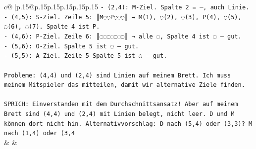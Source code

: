 \documentclass{article}
\begin{document}
{\begin{supertabular}{c@{$\;$}|p{.15\linewidth}@{}p{.15\linewidth}p{.15\linewidth}p{.15\linewidth}p{.15\linewidth}p{.15\linewidth}}
{{{\texttt{{-} (2,4): M{-}Ziel. Spalte 2 = ─, auch Linie.} \\
\texttt{{-} (4,5): S{-}Ziel. Zeile 5: ║M◌◌P◌◌◌║ → M(1), ◌(2), ◌(3), P(4), ◌(5), ◌(6), ◌(7). Spalte 4 ist P.} \\
\texttt{{-} (4,6): P{-}Ziel. Zeile 6: ║◌◌◌◌◌◌◌║ → alle ◌, Spalte 4 ist ◌ – gut.} \\
\texttt{{-} (5,6): O{-}Ziel. Spalte 5 ist ◌ – gut.} \\
\texttt{{-} (5,5): A{-}Ziel. Zeile 5 Spalte 5 ist ◌ – gut.} \\
\\ 
\texttt{Probleme: (4,4) und (2,4) sind Linien auf meinem Brett. Ich muss meinem Mitspieler das mitteilen, damit wir alternative Ziele finden.} \\
\\ 
\texttt{SPRICH: Einverstanden mit dem Durchschnittsansatz! Aber auf meinem Brett sind (4,4) und (2,4) mit Linien belegt, nicht leer. D und M können dort nicht hin. Alternativvorschlag: D nach (5,4) oder (3,3)? M nach (1,4) oder (3,4} \\
            }
        }
    }
    & & \\ \\


\end{supertabular}}
\end{document}
